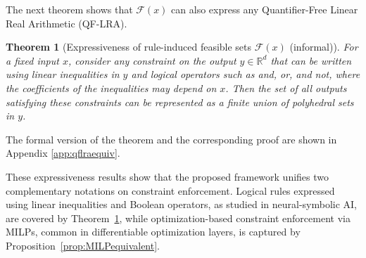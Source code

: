 \documentclass{article}
\theoremstyle{plain}
\newtheorem{theorem}{Theorem}[section]
\newtheorem{proposition}[theorem]{Proposition}
\theoremstyle{definition}
\theoremstyle{remark}
\begin{document}
The next theorem shows that $\mathcal{F}(x)$ can also express any Quantifier-Free Linear Real Arithmetic (QF-LRA). 
\begin{theorem}[Expressiveness of rule-induced feasible sets $\mathcal{F}(x)$ (informal)]
\label{thm:qf_informal}
For a fixed input $x$, consider any constraint on the output $y \in \mathbb{R}^d$
that can be written using linear inequalities in $y$ and logical operators
such as \emph{and}, \emph{or}, and \emph{not}, where the coefficients of the
inequalities may depend on $x$.
Then the set of all outputs satisfying these constraints can be represented as
a finite union of polyhedral sets in $y$.
\end{theorem}
The formal version of the theorem and the corresponding proof are shown in Appendix \ref{app:qflraequiv}. 

These expressiveness results show that the proposed framework unifies two complementary notations on constraint enforcement.
Logical rules expressed using linear inequalities and Boolean operators, as studied in neural-symbolic AI, are covered by Theorem~\ref{thm:qf_informal}, while optimization-based constraint enforcement via MILPs, common in differentiable optimization layers, is captured by Proposition~\ref{prop:MILPequivalent}.








\end{document}
